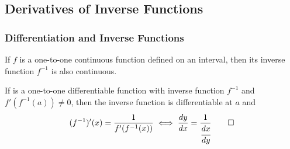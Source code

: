 \subsection{Derivatives of Inverse Functions}
\subsubsection{Differentiation and Inverse Functions}
\begin{theorem}
    If \(f\) is a one-to-one continuous function defined on an interval,
    then its inverse function \(f^{-1}\) is also continuous.
\end{theorem}
\begin{theorem}
    If is a one-to-one differentiable function with inverse function \(f^{-1}\)
    and \(f'(f^{-1}(a))\neq 0\), then the inverse function is differentiable at \(a\) and
    \[(f^{-1})'(x)=\frac{1}{f'(f^{-1}(x))}\iff\frac{dy}{dx}
    =\frac{1}{\cfrac{dx}{dy}}\qedhere\]
\end{theorem}

